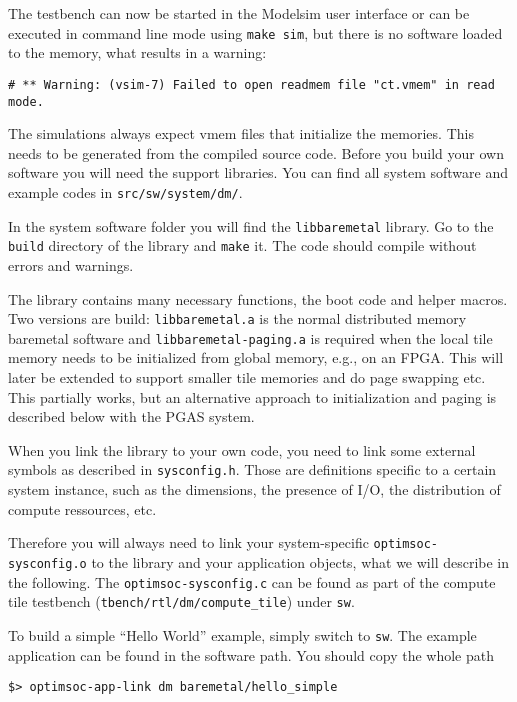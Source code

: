 \medskip
The testbench can now be started in the Modelsim user interface or can
be executed in command line mode using \verb|make sim|, but there is
no software loaded to the memory, what results in a warning:

\begin{lstlisting}
# ** Warning: (vsim-7) Failed to open readmem file "ct.vmem" in read mode.
\end{lstlisting}

The simulations always expect vmem files that initialize the memories.
This needs to be generated from the compiled source code. Before you
build your own software you will need the support libraries. You can
find all system software and example codes in
\verb|src/sw/system/dm/|.

In the system software folder you will find the \verb|libbaremetal|
library. Go to the \verb|build| directory of the library and
\verb|make| it. The code should compile without errors and warnings.

The library contains many necessary functions, the boot code and
helper macros. Two versions are build: \verb|libbaremetal.a| is the
normal distributed memory baremetal software and
\verb|libbaremetal-paging.a| is required when the local tile memory
needs to be initialized from global memory, e.g., on an FPGA. This
will later be extended to support smaller tile memories and do page
swapping etc. This partially works, but an alternative approach to
initialization and paging is described below with the PGAS system.

When you link the library to your own code, you need to link some
external symbols as described in \verb|sysconfig.h|. Those are
definitions specific to a certain system instance, such as the
dimensions, the presence of I/O, the distribution of compute
ressources, etc.

Therefore you will always need to link your system-specific
\verb|optimsoc-sysconfig.o| to the library and your application
objects, what we will describe in the following. The
\verb|optimsoc-sysconfig.c| can be found as part of the compute tile
testbench (\verb|tbench/rtl/dm/compute_tile|) under \verb|sw|.

To build a simple ``Hello World'' example, simply switch to \verb|sw|.
The example application can be found in the software path. You should
copy the whole path

\begin{lstlisting}
$> optimsoc-app-link dm baremetal/hello_simple
\end{lstlisting}

